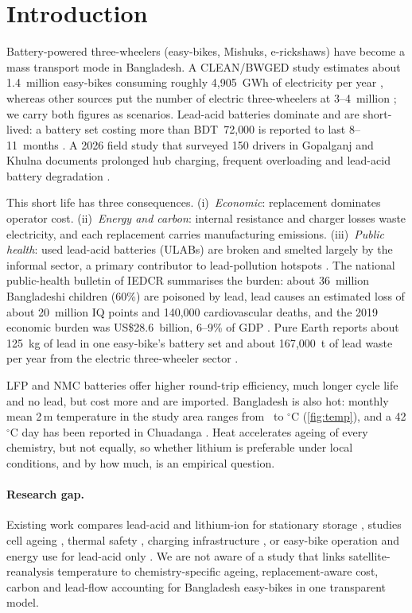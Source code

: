 \section{Introduction}
Battery-powered three-wheelers (easy-bikes, Mishuks, e-rickshaws) have become a mass transport mode in Bangladesh. A CLEAN/BWGED study estimates about 1.4~million easy-bikes consuming roughly 4{,}905~GWh of electricity per year \citep{clean2024}, whereas other sources put the number of electric three-wheelers at 3--4~million \citep{pureearth_smep}; we carry both figures as scenarios. Lead-acid batteries dominate \citep{mordor2026} and are short-lived: a battery set costing more than BDT~72{,}000 is reported to last 8--11~months \citep{fe2024}. A 2026 field study that surveyed 150 drivers in Gopalganj and Khulna documents prolonged hub charging, frequent overloading and lead-acid battery degradation \citep{chowdhury2026}.

This short life has three consequences. (i)~\emph{Economic}: replacement dominates operator cost. (ii)~\emph{Energy and carbon}: internal resistance and charger losses waste electricity, and each replacement carries manufacturing emissions. (iii)~\emph{Public health}: used lead-acid batteries (ULABs) are broken and smelted largely by the informal sector, a primary contributor to lead-pollution hotspots \citep{esdo2021}. The national public-health bulletin of IEDCR summarises the burden: about 36~million Bangladeshi children (60\%) are poisoned by lead, lead causes an estimated loss of about 20~million IQ points and 140{,}000 cardiovascular deaths, and the 2019 economic burden was US\$28.6~billion, 6--9\% of GDP \citep{das2026}. Pure Earth reports about 125~kg of lead in one easy-bike's battery set and about 167{,}000~t of lead waste per year from the electric three-wheeler sector \citep{pureearth_smep}.

LFP and NMC batteries offer higher round-trip efficiency, much longer cycle life and no lead, but cost more and are imported. Bangladesh is also hot: monthly mean 2\,m temperature in the study area ranges from \Tmin\ to \Tmax$^\circ$C (\cref{fig:temp}), and a 42$^\circ$C day has been reported in Chuadanga \citep{heat2025}. Heat accelerates ageing of every chemistry, but not equally, so whether lithium is preferable under local conditions, and by how much, is an empirical question.

\paragraph{Research gap.} Existing work compares lead-acid and lithium-ion for stationary storage \citep{keshan2016,yudhistira2022,jasper2025}, studies cell ageing \citep{yagci2026,jalkanen2015}, thermal safety \citep{schoberl2024}, charging infrastructure \citep{hasan2020}, or easy-bike operation and energy use for lead-acid only \citep{chowdhury2026,peakdemand}. We are not aware of a study that links satellite-reanalysis temperature to chemistry-specific ageing, replacement-aware cost, carbon and lead-flow accounting for Bangladesh easy-bikes in one transparent model. 

